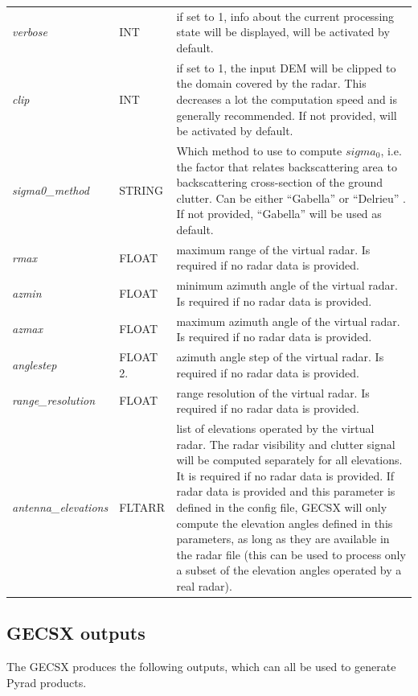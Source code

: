 \documentclass[a4paper,11pt,pdftex,twoside]{scrartcl}
\begin{document}
{{{\begin{longtable}{p{}p{}p{}}
    \textit{verbose} & INT & if set to 1, info about the current processing state will be displayed, will be activated by default. \\
    \textit{clip} & INT & if set to 1, the input DEM will be clipped to the domain covered by the radar. This decreases a lot the computation speed and is generally recommended. If not provided, will be activated by default. \\
    \textit{sigma0\_method} & STRING & Which method to use to compute $sigma_0$, i.e. the factor that relates backscattering area to backscattering cross-section of the ground clutter. Can be either ``Gabella'' \citep{Gabella_JAOT_1998} or ``Delrieu'' \citep{Delrieu_JAOT_1995}. If not provided,  ``Gabella'' will be used as default.\\
     \textit{rmax}  &  FLOAT & maximum range of the virtual radar. Is required if no radar data is provided.\\
    \textit{azmin}   & FLOAT & minimum azimuth angle of the virtual radar. Is required if no radar data is provided.\\
    \textit{azmax}    &    FLOAT & maximum azimuth angle of the virtual radar. Is required if no radar data is provided.\\
    \textit{anglestep}  &  FLOAT 2.  & azimuth angle step of the virtual radar. Is required if no radar data is provided.\\
    \textit{range\_resolution} & FLOAT & range resolution of the virtual radar. Is required if no radar data is provided.\\
    \textit{antenna\_elevations} & FLTARR & list of elevations operated by the virtual radar. The radar visibility and clutter signal will be computed separately for all elevations. It is required if no radar data is provided. If radar data is provided and this parameter is defined in the config file, GECSX will only compute the elevation angles defined in this parameters, as long as they are available in the radar file (this can be used to process only a subset of the elevation angles operated by a real radar).\\
\end{longtable}

\subsection{GECSX outputs}

The GECSX produces the following outputs, which can all be used to generate Pyrad products.

}}}
\end{document}
